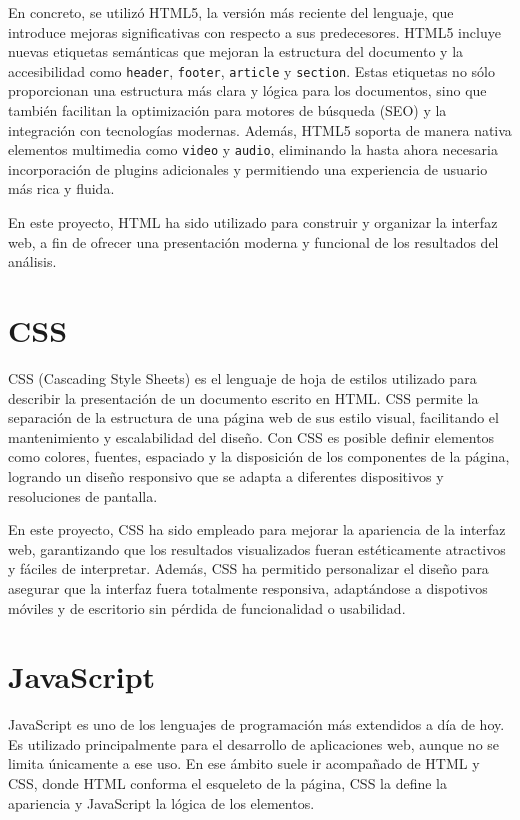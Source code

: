 \documentclass[a4paper, 12pt]{book}
\begin{document}
En concreto, se utilizó HTML5, la versión más reciente del lenguaje, que introduce mejoras significativas con respecto a sus predecesores. HTML5 incluye nuevas etiquetas semánticas que mejoran la estructura del documento y la accesibilidad como \texttt{header}, \texttt{footer}, \texttt{article} y \texttt{section}. Estas etiquetas no sólo proporcionan una estructura más clara y lógica para los documentos, sino que también facilitan la optimización para motores de búsqueda (SEO) y la integración con tecnologías modernas. Además, HTML5 soporta de manera nativa elementos multimedia como \texttt{video} y \texttt{audio}, eliminando la hasta ahora necesaria incorporación de plugins adicionales y permitiendo una experiencia de usuario más rica y fluida.

En este proyecto, HTML ha sido utilizado para construir y organizar la interfaz web, a fin de ofrecer una presentación moderna y funcional de los resultados del análisis.

\section{CSS}
CSS (Cascading Style Sheets) es el lenguaje de hoja de estilos utilizado para describir la presentación de un documento escrito en HTML. CSS permite la separación de la estructura de una página web de sus estilo visual, facilitando el mantenimiento y escalabilidad del diseño. Con CSS es posible definir elementos como colores, fuentes, espaciado y la disposición de los componentes de la página, logrando un diseño responsivo que se adapta a diferentes dispositivos y resoluciones de pantalla.

En este proyecto, CSS ha sido empleado para mejorar la apariencia de la interfaz web, garantizando que los resultados visualizados fueran estéticamente atractivos y fáciles de interpretar. Además, CSS ha permitido personalizar el diseño para asegurar que la interfaz fuera totalmente responsiva, adaptándose a dispotivos móviles y de escritorio sin pérdida de funcionalidad o usabilidad.

\section{JavaScript}
JavaScript \cite{haverbeke_eloquentjs} es uno de los lenguajes de programación más extendidos a día de hoy. Es utilizado principalmente para el desarrollo de aplicaciones web, aunque no se limita únicamente a ese uso. En ese ámbito suele ir acompañado de HTML y CSS, donde HTML conforma el esqueleto de la página, CSS la define la apariencia y JavaScript la lógica de los elementos. 
\end{document}
